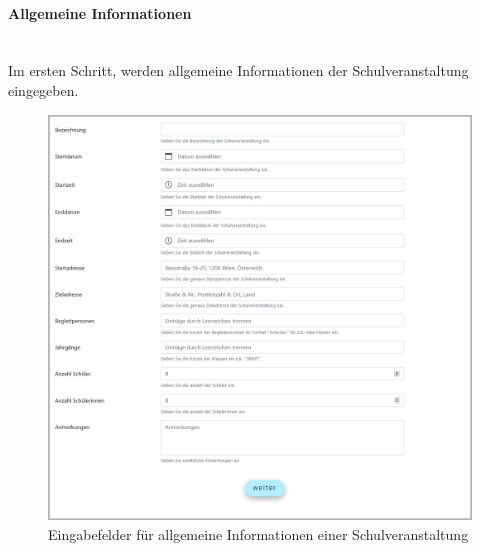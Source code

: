 \paragraph{Allgemeine Informationen}~\\
Im ersten Schritt, werden allgemeine Informationen der Schulveranstaltung eingegeben.
\begin{figure}[H]
	\centering
	\includegraphics[width=1\linewidth]{images/rfoster_implementierung/schoolgeneral}
	\caption[Schulveranstaltungsinformationen eingeben]{Eingabefelder für allgemeine Informationen einer Schulveranstaltung}
	\label{fig:schoolgeneral}
\end{figure}
